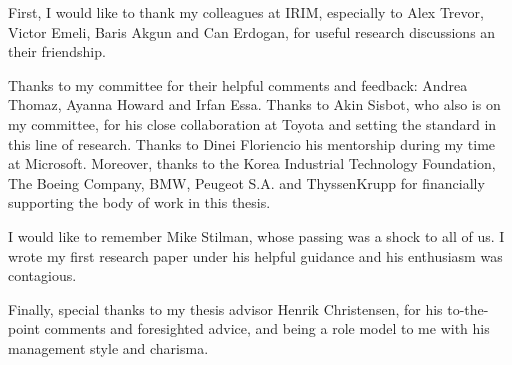 \begin{acknowledgements}

First, I would like to thank my colleagues at IRIM, especially to Alex Trevor, Victor Emeli, Baris Akgun and Can Erdogan, for useful research discussions an their friendship.

Thanks to my committee for their helpful comments and feedback: Andrea Thomaz, Ayanna Howard and Irfan Essa. Thanks to Akin Sisbot, who also is on my committee, for his close collaboration at Toyota and setting the standard in this line of research. Thanks to Dinei Floriencio his mentorship during my time at Microsoft. Moreover, thanks to the Korea Industrial Technology Foundation, The Boeing Company, BMW, Peugeot S.A. and ThyssenKrupp for financially supporting the body of work in this thesis.

I would like to remember Mike Stilman, whose passing was a shock to all of us. I wrote my first research paper under his helpful guidance and his enthusiasm was contagious.

Finally, special thanks to my thesis advisor Henrik Christensen, for his to-the-point comments and foresighted advice, and being a role model to me with his management style and charisma.

\end{acknowledgements}